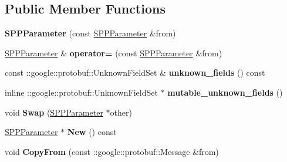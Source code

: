 \subsection*{Public Member Functions}
\begin{DoxyCompactItemize}
\item 
\mbox{\label{classcaffe_1_1_s_p_p_parameter_abbd9921cd4d95074ccc7ea42ceccd4ab}} 
{\bfseries S\+P\+P\+Parameter} (const \mbox{\hyperlink{classcaffe_1_1_s_p_p_parameter}{S\+P\+P\+Parameter}} \&from)
\item 
\mbox{\label{classcaffe_1_1_s_p_p_parameter_a7ca19438883d364f17cb716a4ac23829}} 
\mbox{\hyperlink{classcaffe_1_1_s_p_p_parameter}{S\+P\+P\+Parameter}} \& {\bfseries operator=} (const \mbox{\hyperlink{classcaffe_1_1_s_p_p_parameter}{S\+P\+P\+Parameter}} \&from)
\item 
\mbox{\label{classcaffe_1_1_s_p_p_parameter_ad03c67c167131f29511e0b57fc93a134}} 
const \+::google\+::protobuf\+::\+Unknown\+Field\+Set \& {\bfseries unknown\+\_\+fields} () const
\item 
\mbox{\label{classcaffe_1_1_s_p_p_parameter_ae01b7347735ebbdf0255178d236bea3f}} 
inline \+::google\+::protobuf\+::\+Unknown\+Field\+Set $\ast$ {\bfseries mutable\+\_\+unknown\+\_\+fields} ()
\item 
\mbox{\label{classcaffe_1_1_s_p_p_parameter_a5715173e01679dbd5c25fa3f1cd358db}} 
void {\bfseries Swap} (\mbox{\hyperlink{classcaffe_1_1_s_p_p_parameter}{S\+P\+P\+Parameter}} $\ast$other)
\item 
\mbox{\label{classcaffe_1_1_s_p_p_parameter_a5d71cf171c21ba0b13de234884f0134d}} 
\mbox{\hyperlink{classcaffe_1_1_s_p_p_parameter}{S\+P\+P\+Parameter}} $\ast$ {\bfseries New} () const
\item 
\mbox{\label{classcaffe_1_1_s_p_p_parameter_a45083388eb4aa46c25c00a9a154d709f}} 
void {\bfseries Copy\+From} (const \+::google\+::protobuf\+::\+Message \&from)
\item 
\mbox{\label{classcaffe_1_1_s_p_p_parameter_a23edb5b9dab3340984a797752f4fef97}} 

\end{DoxyCompactItemize}
